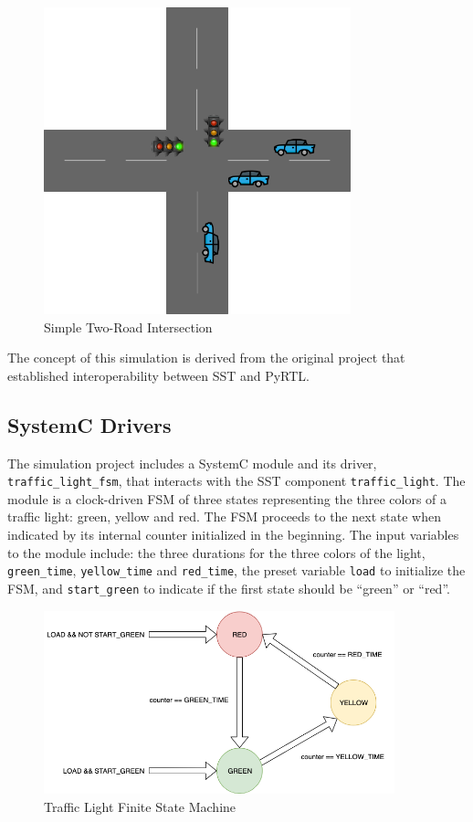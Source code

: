 \documentclass{article}
\begin{document}
  \begin{figure}[!h]
    \centering
    \includegraphics[width=3.5in]{diagrams/intersection.png}
    \caption{Simple Two-Road Intersection}
    \label{fig:intersection}
  \end{figure}

  The concept of this simulation is derived from the original project that established
  interoperability between SST and PyRTL. \cite{pyrtl-sst}

    \subsection{SystemC Drivers}
    The simulation project includes a SystemC module and its driver, \lstinline{traffic_light_fsm},
    that interacts with the SST component \lstinline{traffic_light}. The module is a clock-driven
    FSM of three states representing the three colors of a traffic light: green, yellow and red. The
    FSM proceeds to the next state when indicated by its internal counter initialized in the
    beginning. The input variables to the module include: the three durations for the three colors
    of the light, \lstinline{green_time}, \lstinline{yellow_time} and \lstinline{red_time}, the
    preset variable \lstinline{load} to initialize the FSM, and \lstinline{start_green} to indicate
    if the first state should be ``green'' or ``red''.

    \begin{figure}[!h]
      \centering
      \includegraphics[width=4in]{diagrams/fsm.png}
      \caption{Traffic Light Finite State Machine}
      \label{fig:fsm}
    \end{figure}
\end{document}
